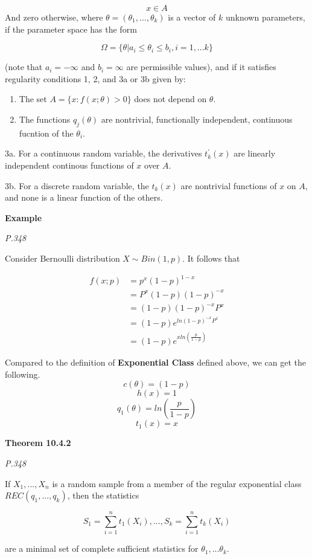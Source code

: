 \documentclass[]{book}
\begin{document}
\[x \in A\]
And zero otherwise, where \(\theta=(\theta_1,...,\theta_k)\) is a vector of \(k\) unknown parameters, if the parameter space has the form

\[\Omega=\{\theta | a_i \leq \theta_i \leq b_i, i=1,...k\}\]

(note that \(a_i=-\infty\) and \(b_i=\infty\) are permissible values), and if it satisfies regularity conditions 1, 2, and 3a or 3b given by:

\begin{enumerate}
\def\labelenumi{(\arabic{enumi})}
\item
  The set \(A=\{x:f(x; \theta)>0\}\) does not depend on \(\theta\).
\item
  The functions \(q_j(\theta)\) are nontrivial, functionally independent, continuous fucntion of the \(\theta_i\).
\end{enumerate}

3a. For a continuous random variable, the derivatives \(t_k^{'}(x)\) are linearly independent continous functions of \(x\) over \(A\).

3b. For a discrete random variable, the \(t_k(x)\) are nontrivial functions of \(x\) on \(A\), and none is a linear function of the others.

\textbf{Example}

\emph{P.348}

Consider Bernoulli distribution \(X \sim Bin(1,p)\). It follows that

\[\begin{aligned} f(x; p) &=p^x(1-p)^{1-x} \\ &=P^x(1-p)(1-p)^{-x} \\ &=(1-p)(1-p)^{-x}P^x \\&=(1-p)e^{ln(1-p)^{-x}P^x} \\ &=(1-p)e^{xln(\frac{p}{1-p})} \end{aligned}\]

Compared to the definition of \textbf{Exponential Class} defined above, we can get the following.
\[c(\theta)=(1-p)\]
\[h(x)=1\]
\[q_1(\theta)=ln(\frac{p}{1-p})\]
\[t_1(x)=x\]

\textbf{Theorem 10.4.2}

\emph{P.348}

If \(X_1,...,X_n\) is a random sample from a member of the regular exponential class \(REC(q_1,...,q_k)\), then the statistics

\[S_1=\sum_{i=1}^n t_1(X_i),...,S_k=\sum_{i=1}^n t_k(X_i)\]

are a minimal set of complete sufficient statistics for \(\theta_1,...\theta_k\).
\end{document}
